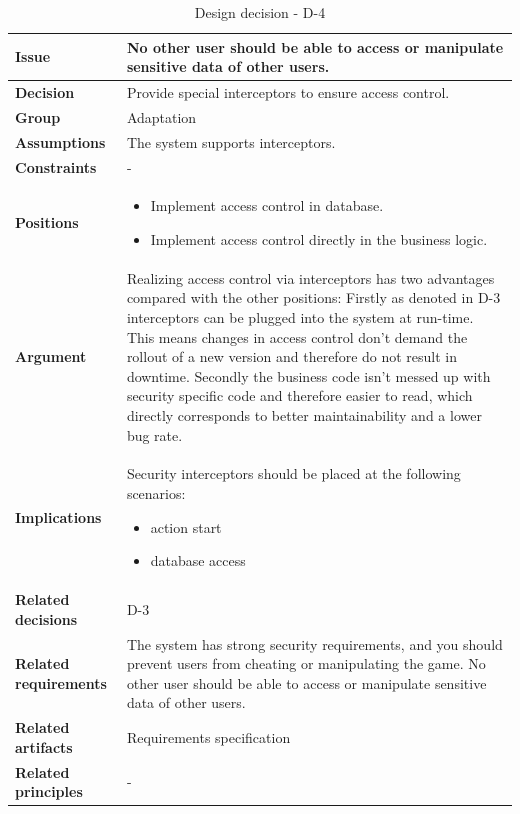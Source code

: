 \documentclass[11pt]{article}
\begin{document}
\begin{table}[h] \small
	\begin{tabularx}{\textwidth}{ | l | X |}
    	\hline
	\cellcolor[gray]{0.9}
    	\textbf{Issue} & No other user should be able to access or manipulate sensitive data of other users. \\
	\hline
	\cellcolor[gray]{0.9}
	\textbf{Decision} & Provide special interceptors to ensure access control. \\ 
	\hline
	\cellcolor[gray]{0.9}
	\textbf{Group} & Adaptation \\ 
	\hline
	\cellcolor[gray]{0.9}
	\textbf{Assumptions} & The system supports interceptors. \\ 
	\hline
	\cellcolor[gray]{0.9}
	\textbf{Constraints} & - \\ 
	\hline
	\cellcolor[gray]{0.9}
	\textbf{Positions} & 
		\begin{itemize}
		\item Implement access control in database.
		\item Implement access control directly in the business logic.
		\end{itemize}\\ 
	\hline
	\cellcolor[gray]{0.9}
	\textbf{Argument} & Realizing access control via interceptors has two advantages compared with the other positions: Firstly as denoted in D-3 interceptors can be plugged into the system at run-time. This means changes in access control don't demand the rollout of a new version and therefore do not result in downtime. Secondly the business code isn't messed up with security specific code and therefore easier to read, which directly corresponds to better maintainability and a lower bug rate. \\ 
	\hline
	\cellcolor[gray]{0.9}
	\textbf{Implications} & Security interceptors should be placed at the following scenarios:
		\begin{itemize}
		\item action start
		\item database access
		\end{itemize}\\ 
	\hline
	\cellcolor[gray]{0.9}
	\textbf{Related decisions} & D-3 \\ 
	\hline
	\cellcolor[gray]{0.9}
	\textbf{Related requirements} & The system has strong security requirements, and you should prevent users from cheating or manipulating the game. No other user should be able to access or manipulate sensitive data of other users.\\
	\hline
	\cellcolor[gray]{0.9}
	\textbf{Related artifacts} & Requirements specification\\
	\hline
	\cellcolor[gray]{0.9}
	\textbf{Related principles} & -\\
	\hline
	\end{tabularx}
	\caption{Design decision - D-4}
	\label{dec:D4}
\end{table}
\end{document}
